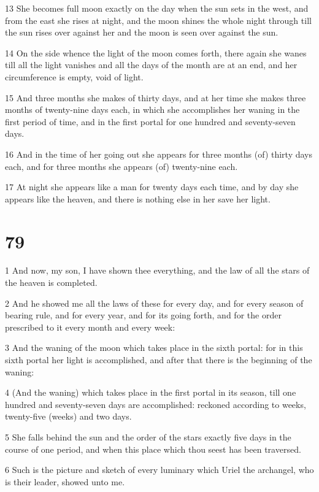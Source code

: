 \par 13 She becomes full moon exactly on the day when the sun sets in the west, and from the east she rises at night, and the moon shines the whole night through till the sun rises over against her and the moon is seen over against the sun.
\par 14 On the side whence the light of the moon comes forth, there again she wanes till all the light vanishes and all the days of the month are at an end, and her circumference is empty, void of light.
\par 15 And three months she makes of thirty days, and at her time she makes three months of twenty-nine days each, in which she accomplishes her waning in the first period of time, and in the first portal for one hundred and seventy-seven days.
\par 16 And in the time of her going out she appears for three months (of) thirty days each, and for three months she appears (of) twenty-nine each.
\par 17 At night she appears like a man for twenty days each time, and by day she appears like the heaven, and there is nothing else in her save her light.

\chapter{79}

\par 1 And now, my son, I have shown thee everything, and the law of all the stars of the heaven is completed.
\par 2 And he showed me all the laws of these for every day, and for every season of bearing rule, and for every year, and for its going forth, and for the order prescribed to it every month and every week:
\par 3 And the waning of the moon which takes place in the sixth portal: for in this sixth portal her light is accomplished, and after that there is the beginning of the waning:
\par 4 (And the waning) which takes place in the first portal in its season, till one hundred and seventy-seven days are accomplished: reckoned according to weeks, twenty-five (weeks) and two days.
\par 5 She falls behind the sun and the order of the stars exactly five days in the course of one period, and when this place which thou seest has been traversed.
\par 6 Such is the picture and sketch of every luminary which Uriel the archangel, who is their leader, showed unto me.

